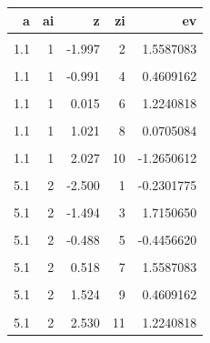 \documentclass[
]{book}
\begin{document}
\begin{table}[!h]
\centering
\begin{tabular}{r|r|r|r|r}
\hline
a & ai & z & zi & ev\\
\hline
\cellcolor{gray!6}{1.1} & \cellcolor{gray!6}{1} & \cellcolor{gray!6}{-2.500} & \cellcolor{gray!6}{1} & \cellcolor{gray!6}{-0.5604756}\\
\hline
1.1 & 1 & -1.997 & 2 & 1.5587083\\
\hline
\cellcolor{gray!6}{1.1} & \cellcolor{gray!6}{1} & \cellcolor{gray!6}{-1.494} & \cellcolor{gray!6}{3} & \cellcolor{gray!6}{0.1292877}\\
\hline
1.1 & 1 & -0.991 & 4 & 0.4609162\\
\hline
\cellcolor{gray!6}{1.1} & \cellcolor{gray!6}{1} & \cellcolor{gray!6}{-0.488} & \cellcolor{gray!6}{5} & \cellcolor{gray!6}{-0.6868529}\\
\hline
1.1 & 1 & 0.015 & 6 & 1.2240818\\
\hline
\cellcolor{gray!6}{1.1} & \cellcolor{gray!6}{1} & \cellcolor{gray!6}{0.518} & \cellcolor{gray!6}{7} & \cellcolor{gray!6}{-0.2301775}\\
\hline
1.1 & 1 & 1.021 & 8 & 0.0705084\\
\hline
\cellcolor{gray!6}{1.1} & \cellcolor{gray!6}{1} & \cellcolor{gray!6}{1.524} & \cellcolor{gray!6}{9} & \cellcolor{gray!6}{1.7150650}\\
\hline
1.1 & 1 & 2.027 & 10 & -1.2650612\\
\hline
\cellcolor{gray!6}{1.1} & \cellcolor{gray!6}{1} & \cellcolor{gray!6}{2.530} & \cellcolor{gray!6}{11} & \cellcolor{gray!6}{-0.4456620}\\
\hline
5.1 & 2 & -2.500 & 1 & -0.2301775\\
\hline
\cellcolor{gray!6}{5.1} & \cellcolor{gray!6}{2} & \cellcolor{gray!6}{-1.997} & \cellcolor{gray!6}{2} & \cellcolor{gray!6}{0.0705084}\\
\hline
5.1 & 2 & -1.494 & 3 & 1.7150650\\
\hline
\cellcolor{gray!6}{5.1} & \cellcolor{gray!6}{2} & \cellcolor{gray!6}{-0.991} & \cellcolor{gray!6}{4} & \cellcolor{gray!6}{-1.2650612}\\
\hline
5.1 & 2 & -0.488 & 5 & -0.4456620\\
\hline
\cellcolor{gray!6}{5.1} & \cellcolor{gray!6}{2} & \cellcolor{gray!6}{0.015} & \cellcolor{gray!6}{6} & \cellcolor{gray!6}{-0.5604756}\\
\hline
5.1 & 2 & 0.518 & 7 & 1.5587083\\
\hline
\cellcolor{gray!6}{5.1} & \cellcolor{gray!6}{2} & \cellcolor{gray!6}{1.021} & \cellcolor{gray!6}{8} & \cellcolor{gray!6}{0.1292877}\\
\hline
5.1 & 2 & 1.524 & 9 & 0.4609162\\
\hline
\cellcolor{gray!6}{5.1} & \cellcolor{gray!6}{2} & \cellcolor{gray!6}{2.027} & \cellcolor{gray!6}{10} & \cellcolor{gray!6}{-0.6868529}\\
\hline
5.1 & 2 & 2.530 & 11 & 1.2240818\\
\hline
\end{tabular}
\end{table}
\end{document}
